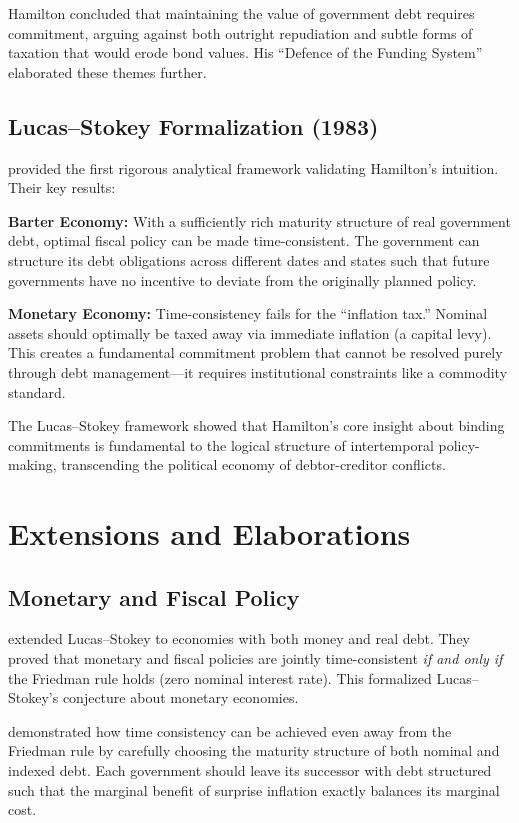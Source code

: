 \documentclass[12pt]{article}
\begin{document}
Hamilton concluded that maintaining the value of government debt requires commitment, arguing against both outright repudiation and subtle forms of taxation that would erode bond values. His ``Defence of the Funding System'' \citep{hamilton_1795_defence} elaborated these themes further.

\subsection{Lucas--Stokey Formalization (1983)}

\citet{lucas_stokey_1983} provided the first rigorous analytical framework validating Hamilton's intuition. Their key results:

\textbf{Barter Economy:} With a sufficiently rich maturity structure of real government debt, optimal fiscal policy can be made time-consistent. The government can structure its debt obligations across different dates and states such that future governments have no incentive to deviate from the originally planned policy.

\textbf{Monetary Economy:} Time-consistency fails for the ``inflation tax.'' Nominal assets should optimally be taxed away via immediate inflation (a capital levy). This creates a fundamental commitment problem that cannot be resolved purely through debt management---it requires institutional constraints like a commodity standard.

The Lucas--Stokey framework showed that Hamilton's core insight about binding commitments is fundamental to the logical structure of intertemporal policy-making, transcending the political economy of debtor-creditor conflicts.

\section{Extensions and Elaborations}

\subsection{Monetary and Fiscal Policy}

\citet{alvarez_kehoe_neumeyer_2004} extended Lucas--Stokey to economies with both money and real debt. They proved that monetary and fiscal policies are jointly time-consistent \emph{if and only if} the Friedman rule holds (zero nominal interest rate). This formalized Lucas--Stokey's conjecture about monetary economies.

\citet{persson_persson_svensson_2006} demonstrated how time consistency can be achieved even away from the Friedman rule by carefully choosing the maturity structure of both nominal and indexed debt. Each government should leave its successor with debt structured such that the marginal benefit of surprise inflation exactly balances its marginal cost.
\end{document}
